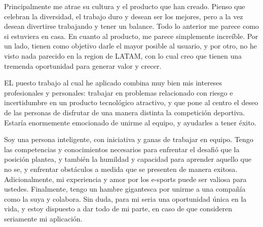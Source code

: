\documentclass[11pt, a4paper]{awesome-cv}
\begin{document}
\begin{cvletter}

Principalmente me atrae su cultura y el producto que han creado. Pienso que celebran la diversidad, el trabajo duro y desean ser los mejores,
pero a la vez desean divertirse trabajando y tener un balance. Todo lo anterior me parece como si estuviera en casa.
En cuanto al producto, me parece simplemente increíble. Por un lado, tienen como objetivo darle el mayor posible al usuario, y por otro, no he visto
nada parecido en la region de LATAM, con lo cual creo que tienen una tremenda oportunidad para generar valor y crecer. 

EL puesto trabajo al cual he aplicado combina muy bien mis intereses profesionales y personales: trabajar en problemas relacionado con riesgo e incertidumbre en un producto
tecnológico atractivo, y que pone al centro el deseo de las personas de disfrutar de una manera distinta la competición deportiva. Estaría enormemente
emocionado de unirme al equipo, y ayudarles a tener éxito. 


Soy una persona inteligente, con iniciativa y ganas de trabajar en equipo. Tengo las competencias y conocimientos necesarios para enfrentar el desafió que
la posición plantea, y también la humildad y capacidad para aprender aquello que no se, y enfrentar obstáculos a medida que se presenten de manera exitosa.
Adicionalmente, mi experiencia y amor por los e-sports puede ser valiosa para ustedes. Finalmente, tengo un hambre gigantesca
por unirme a una compañía como la suya y colabora. Sin duda, para mi seria una oportunidad única en la vida, y estoy dispuesto a dar todo de mi parte,
en caso de que consideren seriamente mi aplicación.

\end{cvletter}


\makeletterclosing
\end{document}
